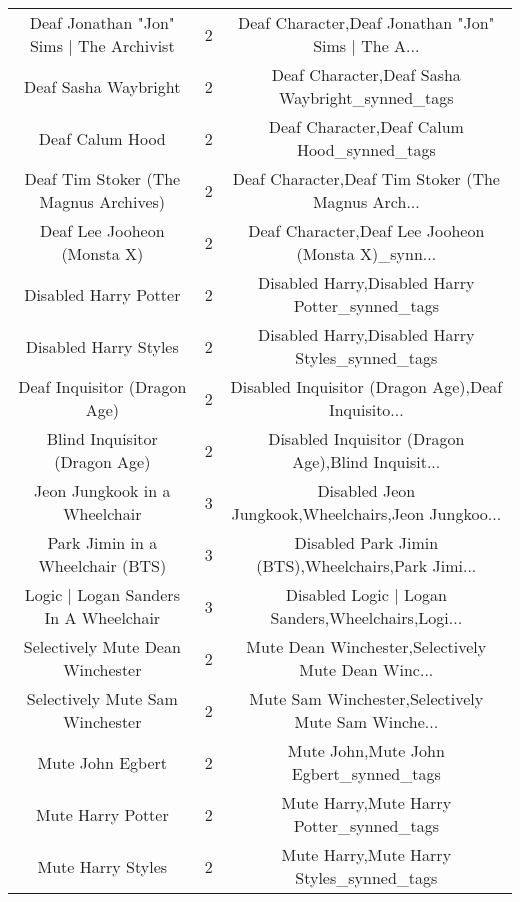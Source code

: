 \begin{table}[h!]
{\begin{tabular}{|c|c|c|}
          Deaf Jonathan "Jon" Sims | The Archivist &          2 & Deaf Character,Deaf Jonathan "Jon" Sims | The A... \\
                              Deaf Sasha Waybright &          2 &    Deaf Character,Deaf Sasha Waybright\_synned\_tags \\
                                   Deaf Calum Hood &          2 &         Deaf Character,Deaf Calum Hood\_synned\_tags \\
             Deaf Tim Stoker (The Magnus Archives) &          2 & Deaf Character,Deaf Tim Stoker (The Magnus Arch... \\
                       Deaf Lee Jooheon (Monsta X) &          2 & Deaf Character,Deaf Lee Jooheon (Monsta X)\_synn... \\
                             Disabled Harry Potter &          2 &   Disabled Harry,Disabled Harry Potter\_synned\_tags \\
                             Disabled Harry Styles &          2 &   Disabled Harry,Disabled Harry Styles\_synned\_tags \\
                      Deaf Inquisitor (Dragon Age) &          2 & Disabled Inquisitor (Dragon Age),Deaf Inquisito... \\
                     Blind Inquisitor (Dragon Age) &          2 & Disabled Inquisitor (Dragon Age),Blind Inquisit... \\
                     Jeon Jungkook in a Wheelchair &          3 & Disabled Jeon Jungkook,Wheelchairs,Jeon Jungkoo... \\
                  Park Jimin in a Wheelchair (BTS) &          3 & Disabled Park Jimin (BTS),Wheelchairs,Park Jimi... \\
             Logic | Logan Sanders In A Wheelchair &          3 & Disabled Logic | Logan Sanders,Wheelchairs,Logi... \\
                  Selectively Mute Dean Winchester &          2 & Mute Dean Winchester,Selectively Mute Dean Winc... \\
                   Selectively Mute Sam Winchester &          2 & Mute Sam Winchester,Selectively Mute Sam Winche... \\
                                  Mute John Egbert &          2 &             Mute John,Mute John Egbert\_synned\_tags \\
                                 Mute Harry Potter &          2 &           Mute Harry,Mute Harry Potter\_synned\_tags \\
                                 Mute Harry Styles &          2 &           Mute Harry,Mute Harry Styles\_synned\_tags \\

\end{tabular}}
\end{table}
